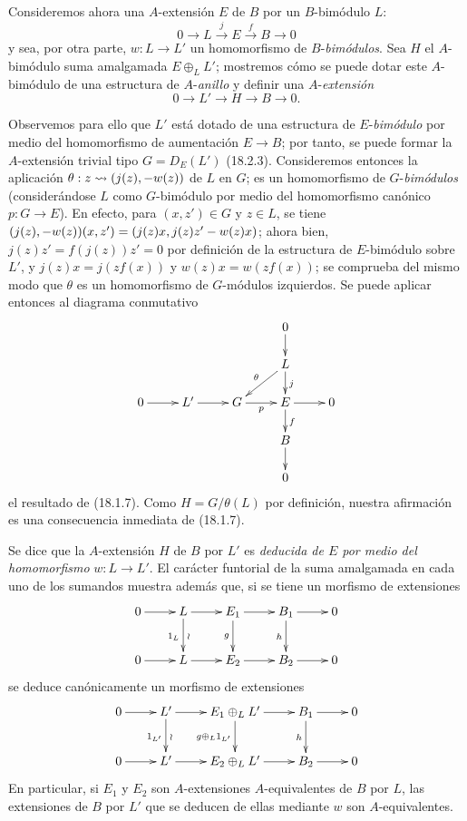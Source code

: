 \begin{env}[18.2.8]
\label{0.18.2.8-fr}
Consideremos ahora una $A$-extensión $E$ de $B$ por un $B$-bimódulo
$L$:
\[
  0\longrightarrow L\xrightarrow{j}E\xrightarrow{f}B\longrightarrow0
\]
y sea, por otra parte, $w:L\to L'$ un homomorfismo de $B$-\emph{bimódulos}. Sea $H$
el $A$-bimódulo suma amalgamada $E\oplus_LL'$; mostremos cómo se puede dotar
este $A$-bimódulo de una estructura de $A$-\emph{anillo} y definir una $A$-\emph{extensión}
\[
  0\longrightarrow L'\longrightarrow H\longrightarrow B\longrightarrow0.
\]

Observemos para ello que $L'$ está dotado de una estructura de $E$-\emph{bimódulo} por
medio del homomorfismo de aumentación $E\to B$; por tanto, se puede formar la
$A$-extensión trivial tipo $G=D_E(L')$ (18.2.3). Consideremos entonces
la aplicación $\theta:z\leadsto(j(z),- w(z))$ de $L$ en $G$; es un
homomorfismo de $G$-\emph{bimódulos} (considerándose $L$ como $G$-bimódulo por
medio del homomorfismo canónico $p:G\to E$). En efecto, para
$(x,z')\in G$ y $z\in L$, se tiene
$(j(z),- w(z))(x,z')=(j(z)x,j(z)z'- w(z)x)$; ahora bien,
$j(z)z'=f(j(z))z'=0$ por definición de la estructura de $E$-bimódulo sobre
$L'$, y $j(z)x=j(zf(x))$ y
$w(z)x=w(zf(x))$; se comprueba del mismo modo que $\theta$ es un homomorfismo de
$G$-módulos izquierdos. Se puede aplicar entonces al diagrama conmutativo
\[
  \xymatrix@C=2pc@R=1.4pc{
    & & & 0\ar[d] & \\
    & & & L\ar[ld]_\theta\ar[d]^j & \\
    0\ar[r] & L'\ar[r] & G\ar[r]_p & E\ar[r]\ar[d]^f & 0\\
    & & & B\ar[d] & \\
    & & & 0 &
  }
\]
el resultado de (18.1.7). Como $H=G/\theta(L)$ por definición, nuestra
afirmación es una consecuencia inmediata de (18.1.7).


Se dice que la $A$-extensión $H$ de $B$ por $L'$ es \emph{deducida de $E$ por
medio del homomorfismo} $w:L\to L'$. El carácter funtorial de la suma
amalgamada en cada uno de los sumandos muestra además que, si se tiene un morfismo
de extensiones
\[
  \xymatrix{
    0\ar[r] & L\ar[r]\ar[d]_{1_L}^{\wr}
      & E_1\ar[r]\ar[d]_g & B_1\ar[r]\ar[d]_h & 0\\
    0\ar[r] & L\ar[r] & E_2\ar[r] & B_2\ar[r] & 0
  }
\]
se deduce canónicamente un morfismo de extensiones
\[
  \xymatrix{
    0\ar[r] & L'\ar[r]\ar[d]_{1_{L'}}^{\wr}
      & E_1\oplus_LL'\ar[r]\ar[d]_{g\oplus_L1_{L'}}
      & B_1\ar[r]\ar[d]_h & 0\\
    0\ar[r] & L'\ar[r] & E_2\oplus_LL'\ar[r] & B_2\ar[r] & 0
  }
\]
En particular, si $E_1$ y $E_2$ son $A$-extensiones $A$-equivalentes de
$B$ por $L$, las extensiones de $B$ por $L'$ que se deducen de ellas mediante $w$
son $A$-equivalentes.


\end{env}
